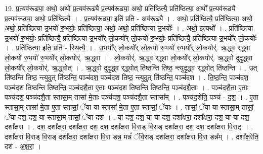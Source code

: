 \documentclass[17pt]{extarticle}
\begin{document}
19. प्र॒त्यव॑रूढ्या॒ अथो॒ अथो᳚ प्र॒त्यव॑रूढ्यै प्र॒त्यव॑रूढ्या॒ अथो॒ प्रति॑ष्ठित्यै॒ प्रति॑ष्ठित्या॒ अथो᳚ प्र॒त्यव॑रूढ्यै प्र॒त्यव॑रूढ्या॒ अथो॒ प्रति॑ष्ठित्यै । . प्र॒त्यव॑रूढ्या॒ इति॑ प्रति - अव॑रूढ्यै । . अथो॒ प्रति॑ष्ठित्यै॒ प्रति॑ष्ठित्या॒ अथो॒ अथो॒ प्रति॑ष्ठित्या उ॒भयो॑ रु॒भयोः॒ प्रति॑ष्ठित्या॒ अथो॒ अथो॒ प्रति॑ष्ठित्या उ॒भयोः᳚ । . अथो॒ इत्यथो᳚ । . प्रति॑ष्ठित्या उ॒भयो॑ रु॒भयोः॒ प्रति॑ष्ठित्यै॒ प्रति॑ष्ठित्या उ॒भयो᳚र् लो॒कयो᳚र् लो॒कयो॑ रु॒भयोः॒ प्रति॑ष्ठित्यै॒ प्रति॑ष्ठित्या उ॒भयो᳚र् लो॒कयोः᳚ । . प्रति॑ष्ठित्या॒ इति॒ प्रति॑ - स्थि॒त्यै॒ । . उ॒भयो᳚र् लो॒कयो᳚र् लो॒कयो॑ रु॒भयो॑ रु॒भयो᳚र् लो॒कयोर्॑. ऋ॒द्ध्व र्‌द्ध्वा लो॒कयो॑ रु॒भयो॑ रु॒भयो᳚र् लो॒कयोर्॑. ऋ॒द्ध्वा । . लो॒कयोर्॑. ऋ॒द्ध्व र्‌द्ध्वा लो॒कयो᳚र् लो॒कयोर्॑. ऋ॒द्ध्वो दुदृ॒द्ध्वा लो॒कयो᳚र् लो॒कयोर्॑. ऋ॒द्ध्वोत् । . ऋ॒द्ध्वो दुदृ॒द्ध्व र्‌द्ध्वोत् ति॑ष्ठन्ति तिष्ठ॒ न्त्युदृ॒द्ध्व र्‌द्ध्वोत् ति॑ष्ठन्ति । . उत् ति॑ष्ठन्ति तिष्ठ॒ न्त्युदुत् ति॑ष्ठन्ति॒ पञ्च॑दश॒ पञ्च॑दश तिष्ठ॒ न्त्युदुत् ति॑ष्ठन्ति॒ पञ्च॑दश । . ति॒ष्ठ॒न्ति॒ पञ्च॑दश॒ पञ्च॑दश तिष्ठन्ति तिष्ठन्ति॒ पञ्च॑दशै॒ता ए॒ताः पञ्च॑दश तिष्ठन्ति तिष्ठन्ति॒ पञ्च॑दशै॒ताः । . पञ्च॑दशै॒ता ए॒ताः पञ्च॑दश॒ पञ्च॑दशै॒ता स्तासा॒म् तासा॑ मे॒ताः पञ्च॑दश॒ पञ्च॑दशै॒ता स्तासा᳚म् । . पञ्च॑द॒शेति॒ पञ्च॑ - द॒श॒ । . ए॒ता स्तासा॒म् तासा॑ मे॒ता ए॒ता स्तासां॒ ॅया या स्तासा॑ मे॒ता ए॒ता स्तासां॒ ॅयाः । . तासां॒ ॅया या स्तासा॒म् तासां॒ ॅया दश॒ दश॒ या स्तासा॒म् तासां॒ ॅया दश॑ । . या दश॒ दश॒ या या दश॒ दशा᳚क्षरा॒ दशा᳚क्षरा॒ दश॒ या या दश॒ दशा᳚क्षरा । . दश॒ दशा᳚क्षरा॒ दशा᳚क्षरा॒ दश॒ दश॒ दशा᳚क्षरा वि॒राड् वि॒राड् दशा᳚क्षरा॒ दश॒ दश॒ दशा᳚क्षरा वि॒राट् । . दशा᳚क्षरा वि॒राड् वि॒राड् दशा᳚क्षरा॒ दशा᳚क्षरा वि॒रा डन्न॒ मन्नं॑ ॅवि॒राड् दशा᳚क्षरा॒ दशा᳚क्षरा वि॒रा डन्न᳚म् । . दशा᳚क्ष॒रेति॒ दश॑ - अ॒क्ष॒रा॒ । \newline
\end{document}

